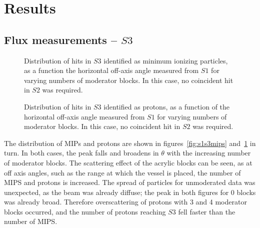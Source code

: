 \section{Results}
\label{hptpcPaper:sec:Results}

\subsection{Flux measurements -- $\mathit{S3}$}
  
  \begin{figure}[h]
    \begin{minipage}{0.48\textwidth}
      \begin{adjustbox}{max totalsize={\textwidth}{.35\textheight},center}
	
      \end{adjustbox}
      \caption{Distribution of hits in $\mathit{S3}$ identified as minimum ionizing particles, as a function the horizontal off-axis angle measured from $\mathit{S1}$ for varying numbers of moderator blocks. In this case, no coincident hit in $\mathit{S2}$ was required.}
      \label{fig:s1s3mips}
    \end{minipage}
    \hspace{0.3cm}
    \begin{minipage}{0.48\textwidth}
      \begin{adjustbox}{max totalsize={\textwidth}{.35\textheight},center}
	
      \end{adjustbox}
      \caption{Distribution of hits in $\mathit{S3}$ identified as protons, as a function of the horizontal off-axis angle measured from $\mathit{S1}$ for varying numbers of moderator blocks. In this case, no coincident hit in $\mathit{S2}$ was required.}
      \label{fig:s1s3protons}
    \end{minipage}
  \end{figure}

  The distribution of MIPs and protons are shown in figures~\ref{fig:s1s3mips} and~\ref{fig:s1s3protons} in turn. 
  In both cases, the peak falls and broadens in $\theta$ with the increasing number of moderator blocks. 
  The scattering effect of the acrylic blocks can be seen, as at off axis angles, such as the range at which the vessel is placed, the number of MIPS and protons is increased.
  The spread of particles for unmoderated data was unexpected, as the beam was already diffuse; the peak in both figures for 0 blocks was already broad.
  Therefore overscattering of protons with 3 and 4 moderator blocks occurred, and the number of protons reaching $\mathit{S3}$ fell faster than the number of MIPS.

